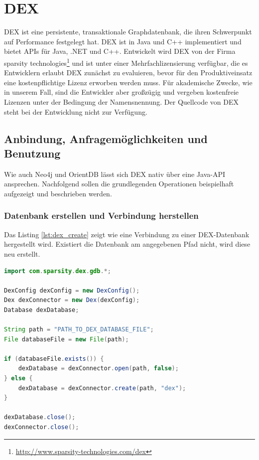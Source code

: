 \documentclass[11pt, a4paper, oneside]{article} %
\begin{document}
\section{DEX}

DEX ist eine persistente, transaktionale Graphdatenbank, die ihren Schwerpunkt auf Performance festgelegt hat. DEX ist in Java und C++ implementiert und bietet APIs für Java, .NET und C++. Entwickelt wird DEX von der Firma sparsity technologies\footnote{\url{http://www.sparsity-technologies.com/dex}} und ist unter einer Mehrfachlizensierung verfügbar, die es Entwicklern erlaubt DEX zunächst zu evaluieren, bevor für den Produktiveinsatz eine kostenpflichtige Lizenz erworben werden muss. Für akademische Zwecke, wie in unserem Fall, sind die Entwickler aber großzügig und vergeben kostenfreie Lizenzen unter der Bedingung der Namensnennung. Der Quellcode von DEX steht bei der Entwicklung nicht zur Verfügung.

\subsection{Anbindung, Anfragemöglichkeiten und Benutzung}
Wie auch Neo4j und OrientDB lässt sich DEX nativ über eine Java-API ansprechen. Nachfolgend sollen die grundlegenden Operationen beispielhaft aufgezeigt und beschrieben werden.

\subsubsection{Datenbank erstellen und Verbindung herstellen}
Das Listing \ref{lst:dex_create} zeigt wie eine Verbindung zu einer DEX-Datenbank hergestellt wird. Existiert die Datenbank am angegebenen Pfad nicht, wird diese neu erstellt.

\begin{lstlisting}[caption={DEX - Datenbank erstellen und Verbindung herstellen},label={lst:dex_create},language=Java]
import com.sparsity.dex.gdb.*;

DexConfig dexConfig = new DexConfig();
Dex dexConnector = new Dex(dexConfig);
Database dexDatabase;

String path = "PATH_TO_DEX_DATABASE_FILE";
File databaseFile = new File(path);

if (databaseFile.exists()) {
	dexDatabase = dexConnector.open(path, false);
} else {
	dexDatabase = dexConnector.create(path, "dex");
}

dexDatabase.close();
dexConnector.close();
\end{lstlisting}
\end{document}
